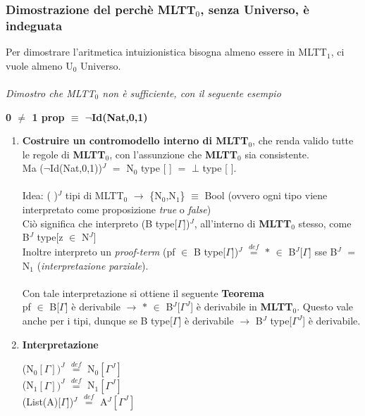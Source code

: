 \subsubsection{Dimostrazione del perch\`e MLTT$_0$, senza Universo, \`e indeguata}
\label{subsec:dimostro-perch\`e-MLTT$_0$-senza-Universo-\`e-indeguata}
Per dimostrare l'aritmetica intuizionistica bisogna almeno essere in MLTT$_1$, ci vuole almeno U$_0$ Universo.\\\\
\textit{Dimostro che MLTT$_0$ non \`e sufficiente, con il seguente esempio}
\begin{center}
\textbf{0 $\neq$ 1 prop $\equiv$ $\neg$Id(Nat,0,1)}
\end{center}
\noindent
\begin{enumerate}
\item \textbf{Costruire un contromodello interno di MLTT$_0$}, che renda valido tutte le regole di \textbf{MLTT$_0$}, con l'assunzione che \textbf{MLTT$_0$} sia consistente.\\
Ma ($\neg$Id(Nat,0,1))$^J$ $=$ N$_0$ type [ ] $=$ $\bot$ type [ ].\\\\
\noindent
Idea: ( )$^J$ tipi di MLTT$_0$ $\rightarrow$ \{N$_0$,N$_1$\} $\equiv$ Bool (ovvero ogni tipo viene interpretato come proposizione \textit{true} o \textit{false})\\
Ci\`o significa che interpreto (B type[$\Gamma$])$^J$, all'interno di \textbf{MLTT$_0$} stesso, come B$^J$ type[z $\in$ N$^J$]\\
Inoltre interpreto un \textit{proof-term} (pf $\in$ B type[$\Gamma$])$^J$ ${\overset{\mathit{def}}{=}}$ $\ast$ $\in$ B$^J$[$\Gamma$] sse B$^J$ $=$ N$_1$ (\textit{interpretazione parziale}).\\\\
\noindent
Con tale interpretazione si ottiene il seguente \textbf{Teorema}\\
pf $\in$ B[$\Gamma$] \`e derivabile $\rightarrow$ $\ast$ $\in$ B$^J$[$\Gamma^J$] \`e derivabile in \textbf{MLTT$_0$}. Questo vale anche per i tipi, dunque se B type[$\Gamma$] \`e derivabile $\rightarrow$ B$^J$ type[$\Gamma^J$] \`e derivabile.
\item \textbf{Interpretazione}
\begin{center}
(N$_0[\Gamma])^J$ ${\overset{\mathit{def}}{=}}$ N$_0[\Gamma^J]$\\
(N$_1[\Gamma])^J$ ${\overset{\mathit{def}}{=}}$ N$_1[\Gamma^J]$\\
(List(A)[$\Gamma$])$^J$ ${\overset{\mathit{def}}{=}}$ A$^J[\Gamma^J]$\\

\end{center}
\end{enumerate}
